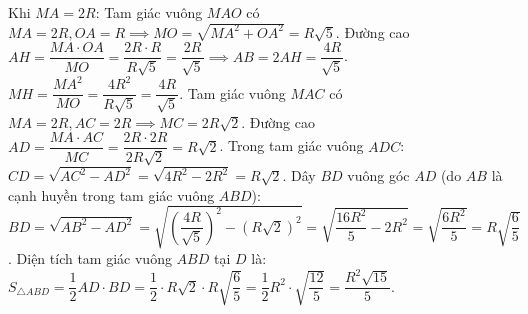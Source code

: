 \begin{bt}
{\begin{enumerate}[a)]
    Khi $MA = 2R$:
    Tam giác vuông $MAO$ có $MA = 2R, OA = R \implies MO = \sqrt{MA^2 + OA^2} = R\sqrt{5}$.
    Đường cao $AH = \dfrac{MA \cdot OA}{MO} = \dfrac{2R \cdot R}{R\sqrt{5}} = \dfrac{2R}{\sqrt{5}} \implies AB = 2AH = \dfrac{4R}{\sqrt{5}}$.
    $MH = \dfrac{MA^2}{MO} = \dfrac{4R^2}{R\sqrt{5}} = \dfrac{4R}{\sqrt{5}}$.
    Tam giác vuông $MAC$ có $MA = 2R, AC = 2R \implies MC = 2R\sqrt{2}$.
    Đường cao $AD = \dfrac{MA \cdot AC}{MC} = \dfrac{2R \cdot 2R}{2R\sqrt{2}} = R\sqrt{2}$.
    Trong tam giác vuông $ADC$: $CD = \sqrt{AC^2 - AD^2} = \sqrt{4R^2 - 2R^2} = R\sqrt{2}$.
    Dây $BD$ vuông góc $AD$ (do $AB$ là cạnh huyền trong tam giác vuông $ABD$):
    $BD = \sqrt{AB^2 - AD^2} = \sqrt{\left(\dfrac{4R}{\sqrt{5}}\right)^2 - (R\sqrt{2})^2} = \sqrt{\dfrac{16R^2}{5} - 2R^2} = \sqrt{\dfrac{6R^2}{5}} = R\sqrt{\dfrac{6}{5}}$.
    Diện tích tam giác vuông $ABD$ tại $D$ là:
    $S_{\triangle ABD} = \dfrac{1}{2} AD \cdot BD = \dfrac{1}{2} \cdot R\sqrt{2} \cdot R\sqrt{\dfrac{6}{5}} = \dfrac{1}{2} R^2 \cdot \sqrt{\dfrac{12}{5}} = \dfrac{R^2\sqrt{15}}{5}$.
\end{enumerate}
}
\end{bt}
